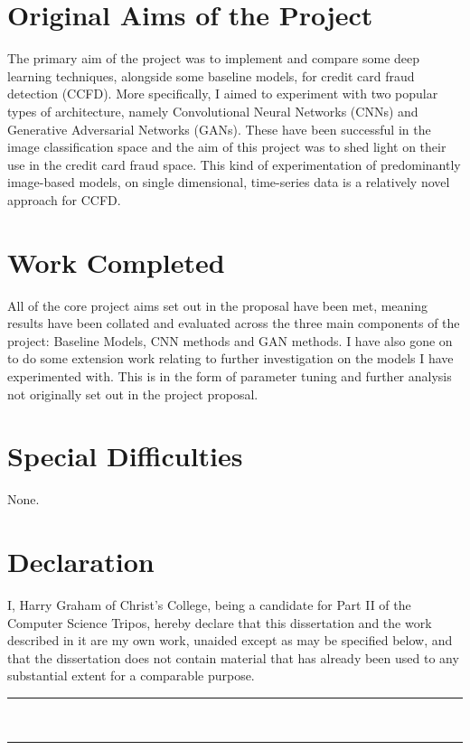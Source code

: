 \documentclass[12pt,a4paper,twoside]{report}
\begin{document}
\section*{Original Aims of the Project}
The primary aim of the project was to implement and compare some deep learning techniques, alongside some baseline models, for credit card fraud detection (CCFD). More specifically, I aimed to experiment with two popular types of architecture, namely Convolutional Neural Networks (CNNs)  \cite{DBLP:journals/corr/SimonyanZ14a} and Generative Adversarial Networks (GANs). These have been successful in the image classification space and the aim of this project was to shed light on their use in the credit card fraud space. This kind of experimentation of predominantly image-based models, on single dimensional, time-series data is a relatively novel approach for CCFD.

\section*{Work Completed}
All of the core project aims set out in the proposal have been met, meaning results have been collated and evaluated across the three main components of the project: Baseline Models, CNN methods and GAN methods. 
I have also gone on to do some extension work relating to further investigation on the models I have experimented with. This is in the form of parameter tuning and further analysis not originally set out in the project proposal.

\section*{Special Difficulties}
None.


\newpage
\section*{Declaration}

I, Harry Graham of Christ's College, being a candidate for Part II of the Computer Science Tripos, hereby declare that this dissertation and the work described in it are my own work, unaided except as may be specified below, and that the dissertation does not contain material that has already been used to any substantial extent for a comparable purpose.

\vspace{1cm}
\begin{multicols}{2}

\rule{5cm}{0.15mm} \\

\columnbreak

\rule{5cm}{0.15mm} \\

\end{multicols}
\end{document}
